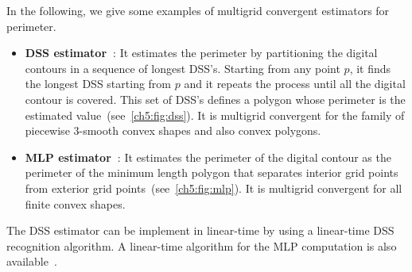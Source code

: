 In the following, we give some examples of multigrid convergent estimators for perimeter.

\begin{itemize}
	\item[]{\textbf{DSS estimator~\cite{kovalevsky92theoretical}}: It estimates the perimeter by partitioning the digital contours in a sequence of longest DSS's. Starting from any point $p$, it finds the longest DSS starting from $p$ and it repeats the process until all the digital contour is covered. This set of DSS's defines a polygon whose perimeter is the estimated value~(see~\cref{ch5:fig:dss}). It is multigrid convergent for the family of piecewise $3$-smooth convex shapes and also convex polygons.}
	\item[]{\textbf{MLP estimator~\cite{sloboda98approximation}}: It estimates the perimeter of the digital contour as the perimeter of the minimum length polygon that separates interior grid points from exterior grid points~(see~\cref{ch5:fig:mlp}). It is multigrid convergent for all finite convex shapes.}
\end{itemize}

The DSS estimator can be implement in linear-time by using a linear-time DSS recognition algorithm. A linear-time algorithm for the MLP computation is also available~\cite{provenccal09two}.


